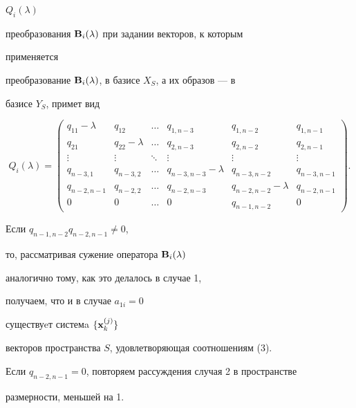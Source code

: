 \begin{pf}
$Q_i(\lambda)$ 


преобразования $\bold B_i(\lambda)$ при задании векторов, к которым 


применяется 


преобразование $\bold B_i(\lambda)$, в базисе $X_S$, а их образов --- в 


базисе $Y_S$, примет вид 


$$ 


Q_i(\lambda)= 


\begin{pmatrix} 


q_{11}-\lambda & q_{12} & \dotsc & q_{1,n-3} & 


q_{1,n-2} & q_{1,n-1} \\ 


q_{21} & q_{22}-\lambda & \dotsc & q_{2,n-3} & q_{2,n-2} 


& q_{2,n-1} \\ 


\vdots & \vdots & \ddots & \vdots & \vdots & \vdots \\ 


q_{n-3,1} & q_{n-3,2} & \dotsc & q_{n-3,n-3}-\lambda 


& q_{n-3,n-2} & q_{n-3,n-1} \\ 


q_{n-2,n-1} & q_{n-2,2} & \dotsc & q_{n-2,n-3} & q_{n-2,n-2}-\lambda


& q_{n-2,n-1} \\ 


0 & 0 & \dotsc & 0 & q_{n-1,n-2} & 0 


\end{pmatrix} 


. 


$$ 


 


Если $q_{n-1,n-2}q_{n-2,n-1}\ne0$,


то, рассматривая сужение оператора $\bold B_i(\lambda)$


аналогично тому, как это делалось в случае 1,


получаем, что и в случае $a_{1i}=0$ 


существуeт системa $\{\bold x^{(j)}_k\}$


векторов пространства $S$, удовлетворяющая соотношениям (3). 


Если $q_{n-2,n-1}=0$, повторяем рассуждения случая 2 в пространстве 


размерности, меньшей на 1.



\end{pf}
